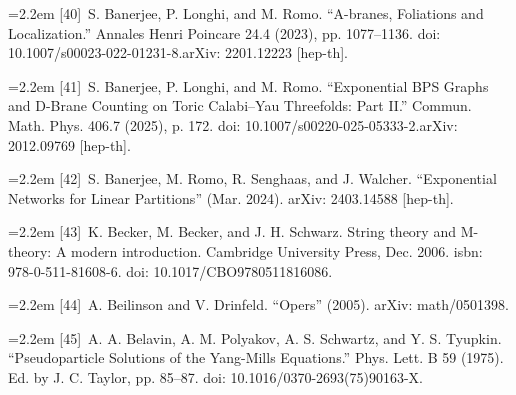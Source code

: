 \noindent\hangindent=2.2em [40]\ S. Banerjee, P. Longhi, and M. Romo. “A-branes, Foliations and Localization.” Annales Henri Poincare 24.4 (2023), pp. 1077--1136. doi: 10.1007/s00023-022-01231-8.arXiv: 2201.12223 [hep-th].\par
\noindent\hangindent=2.2em [41]\ S. Banerjee, P. Longhi, and M. Romo. “Exponential BPS Graphs and D-Brane Counting on Toric Calabi--Yau Threefolds: Part II.” Commun. Math. Phys. 406.7 (2025), p. 172. doi: 10.1007/s00220-025-05333-2.arXiv: 2012.09769 [hep-th].\par
\noindent\hangindent=2.2em [42]\ S. Banerjee, M. Romo, R. Senghaas, and J. Walcher. “Exponential Networks for Linear Partitions” (Mar. 2024). arXiv: 2403.14588 [hep-th].\par
\noindent\hangindent=2.2em [43]\ K. Becker, M. Becker, and J. H. Schwarz. String theory and M-theory: A modern introduction. Cambridge University Press, Dec. 2006. isbn: 978-0-511-81608-6. doi: 10.1017/CBO9780511816086.\par
\noindent\hangindent=2.2em [44]\ A. Beilinson and V. Drinfeld. “Opers” (2005). arXiv: math/0501398.\par
\noindent\hangindent=2.2em [45]\ A. A. Belavin, A. M. Polyakov, A. S. Schwartz, and Y. S. Tyupkin. “Pseudoparticle Solutions of the Yang-Mills Equations.” Phys. Lett. B 59 (1975). Ed. by J. C. Taylor, pp. 85--87. doi: 10.1016/0370-2693(75)90163-X.\par
